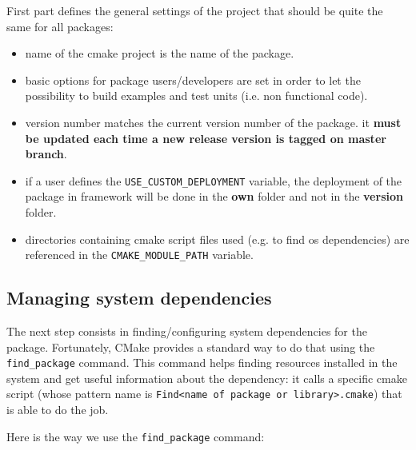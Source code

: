 \documentclass[12pt,a4paper]{article}
\begin{document}
First part defines the general settings of the project that should be quite the same for all packages:
\begin{itemize}
\item name of the cmake project is the name of the package.
\item basic options for package users/developers are set in order to let the possibility to build examples and test units (i.e. non functional code).
\item version number matches the current version number of the package. it \textbf{must be updated each time a new release version is tagged on master branch}.
\item if a user defines the \verb|USE_CUSTOM_DEPLOYMENT| variable, the deployment of the package in framework will be done in the \textbf{own} folder and not in the \textbf{version} folder.
\item directories containing cmake script files used (e.g. to find os dependencies) are referenced in the \verb|CMAKE_MODULE_PATH| variable. 
\end{itemize}

\subsection{Managing system dependencies}

The next step consists in finding/configuring system dependencies for the package. Fortunately, CMake provides a standard way to do that using the \verb|find_package| command. This command helps finding resources installed in the system and get useful information about the dependency: it calls a specific cmake script (whose pattern name is \texttt{Find<name of package or library>.cmake}) that is able to do the job.

Here is the way we use the \verb|find_package| command:
\end{document}
